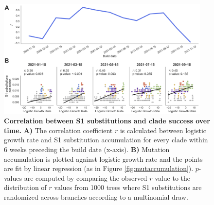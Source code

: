 \documentclass[11pt,oneside,letterpaper]{article}
\begin{document}
\begin{figure}[h!]
\centerline{\includegraphics[width=0.95\textwidth]{disc_supp_r_over_time.png}}
\caption{\textbf{Correlation between S1 substitutions and clade success over time.}
\textbf{A)} The correlation coefficient $r$ is calculated between logistic growth rate and S1 substitution accumulation for every clade within 6 weeks preceding the build date (x-axis). 
\textbf{B)} Mutation accumulation is plotted against logistic growth rate and the points are fit by linear regression (as in Figure \ref{fig:mutaccumulation}). $p$-values are computed by comparing the observed $r$ value to the distribution of $r$ values from 1000 trees where S1 substitutions are randomized across branches according to a multinomial draw.
}
\label{fig:rovertime}
\end{figure}
\end{document}
